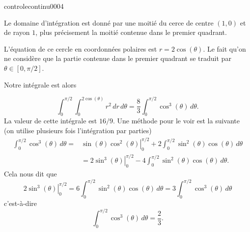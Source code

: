 \begin{corrige}{controlecontinu0004}


Le domaine d'intégration est donné par une moitié du cerce de centre $(1,0)$ et de rayon $1$, plus précisement la moitié contenue dans le premier quadrant. 

L'équation de ce cercle en  coordonnées polaires est $r=2\cos(\theta)$. Le fait qu'on ne considère que la partie contenue dans le premier quadrant se traduit par $\theta\in[0,\pi/2]$. 

Notre intégrale est alors 

\[
\int_0^{\pi/2}\int_0^{2\cos(\theta)} r^2\, dr\,d\theta= \frac{8}{3}\int_0^{\pi/2}\cos^3(\theta) \, d\theta. 
\]
La valeur de cette intégrale est $16/9$. Une méthode pour le voir est la suivante (on utilise plusieurs fois l'intégration par parties)   
\begin{equation}
  \begin{aligned}
    \int_0^{\pi/2}\cos^3(\theta) \, d\theta=& \left.\sin(\theta)\cos^2(\theta)\right\vert_0^{\pi/2} + 2\int_0^{\pi/2}\sin^2(\theta)\cos(\theta) \, d\theta\\
    &= \left.2\sin^3(\theta)\right\vert_0^{\pi/2} - 4\int_0^{\pi/2}\sin^2(\theta)\cos(\theta) \, d\theta.
  \end{aligned}
\end{equation}
Cela nous  dit que 
\begin{equation}
  \left.2\sin^3(\theta)\right\vert_0^{\pi/2} = 6\int_0^{\pi/2}\sin^2(\theta)\cos(\theta) \, d\theta=3\int_0^{\pi/2}\cos^3(\theta) \, d\theta
\end{equation}
c'est-à-dire 
\[
\int_0^{\pi/2}\cos^3(\theta) \, d\theta=\frac{2}{3}.
\]
\end{corrige}
